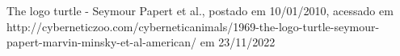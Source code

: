 \documentclass[
12pt,		%
openright,	%
twoside,  %
a4paper,			%
chapter=TITLE,		%
english,			%
french,				%
spanish,			%
brazil				%
]{USPSC-classe/USPSC}
\begin{document}
\begin{flushleft}
\begin{flushleft}
\begin{flushleft}
\begin{flushleft}
\begin{flushleft}
\begin{flushleft}
\begin{flushleft}
\begin{flushleft}
\begin{flushleft}
\begin{flushleft}
[CIBERNECTZOO, 2010] The logo turtle - Seymour Papert et al., postado em 10/01/2010, acessado em http://cyberneticzoo.com/cyberneticanimals/1969-the-logo-turtle-seymour-papert-marvin-minsky-et-al-american/ em 23/11/2022
\end{flushleft}


\end{flushleft}


\end{flushleft}


\end{flushleft}


\end{flushleft}


\end{flushleft}


\end{flushleft}


\end{flushleft}


\end{flushleft}


\end{flushleft}
\end{document}
